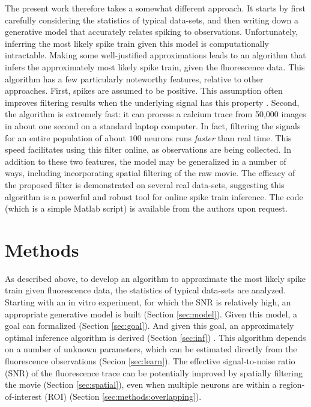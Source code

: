 The present work therefore takes a somewhat different approach.  It starts by first carefully considering the statistics of typical data-sets, and then writing down a generative model that accurately relates spiking to observations. Unfortunately, inferring the most likely spike train given this model is computationally intractable.  Making some well-justified approximations leads to an algorithm that infers the approximately most likely spike train, given the fluorescence data.  This algorithm has a few particularly noteworthy features, relative to other approaches.  First, spikes are assumed to be positive.  This assumption often improves filtering results when the underlying signal has this property \cite{LeeSeung99, HuysPaninski06}.  Second, the algorithm is extremely fast: it can process a calcium trace from 50,000 images in about one second on a standard laptop computer. In fact, filtering the signals for an entire population of about $100$ neurons runs \emph{faster} than real time. This speed facilitates using this filter online, as observations are being collected. In addition to these two features, the model may be generalized in a number of ways, including incorporating spatial filtering of the raw movie. The efficacy of the proposed filter is demonstrated on several real data-sets, suggesting this algorithm is a powerful and robust tool for online spike train inference.  The code (which is a simple Matlab script) is available from the authors upon request.







\section{Methods} \label{sec:methods}

As described above, to develop an algorithm to approximate the most likely spike train given fluorescence data, the statistics of typical data-sets are analyzed.  Starting with an in vitro experiment, for which the SNR is relatively high, an appropriate generative model is built (Section \ref{sec:model}).  Given this model, a goal can formalized (Section \ref{sec:goal}).  And given this goal, an approximately optimal inference algorithm is derived (Section \ref{sec:inf}) .  This algorithm depends on a number of unknown parameters, which can be estimated directly from the fluorescence observations (Secion \ref{sec:learn}).  The effective signal-to-noise ratio (SNR) of the fluorescence trace can be potentially improved by spatially filtering the movie (Section \ref{sec:spatial}), even when multiple neurons are within a region-of-interest (ROI) (Section \ref{sec:methods:overlapping}).  


